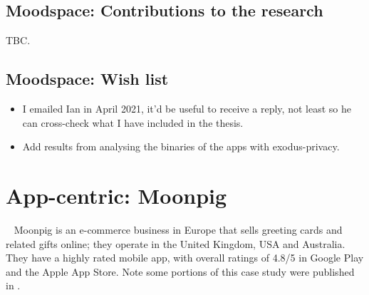 

\subsection{Moodspace: Contributions to the research}
TBC.

\subsection*{Moodspace: Wish list}
{\small
\begin{itemize}
    \item I emailed Ian in April 2021, it'd be useful to receive a reply, not least so he can cross-check what I have included in the thesis.
    \item Add results from analysing the binaries of the apps with exodus-privacy.
\end{itemize}
}

\clearpage


\section{App-centric: Moonpig}~\label{case-study-overview-moonpig}
Moonpig is an e-commerce business in Europe that sells greeting cards and related gifts online; they operate in the United Kingdom, USA and Australia. They have a highly rated mobile app, with overall ratings of 4.8/5 in Google Play and the Apple App Store. Note some portions of this case study were published in \citep{harty_better_android_apps_using_android_vitals}.

